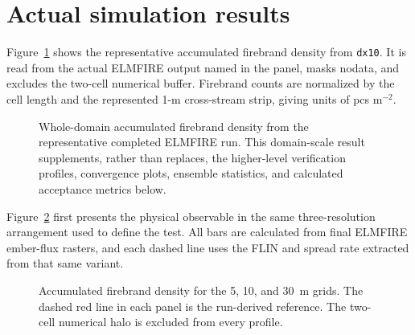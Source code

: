 \section{Actual simulation results}

Figure~\ref{fig:domain-result} shows the representative accumulated firebrand density from \texttt{dx10}.
It is read from the actual ELMFIRE output named in the panel, masks nodata, and excludes
the two-cell numerical buffer.  Firebrand counts are normalized by the cell length and the represented 1-m cross-stream strip, giving units of pcs m$^{-2}$.

\begin{figure}[H]
\centering
{}
\caption{Whole-domain accumulated firebrand density from the representative completed ELMFIRE run.  This
domain-scale result supplements, rather than replaces, the higher-level verification
profiles, convergence plots, ensemble statistics, and calculated acceptance metrics below.}
\label{fig:domain-result}
\end{figure}


Figure~\ref{fig:biomass-emission-resolution} first presents the physical
observable in the same three-resolution arrangement used to define the test.
All bars are calculated from final ELMFIRE ember-flux rasters, and each dashed
line uses the FLIN and spread rate extracted from that same variant.

\begin{figure}[H]
  \centering
  \caption{Accumulated firebrand density for the 5, 10, and 30~m grids. The
  dashed red line in each panel is the run-derived reference. The two-cell
  numerical halo is excluded from every profile.}
  \label{fig:biomass-emission-resolution}
\end{figure}



